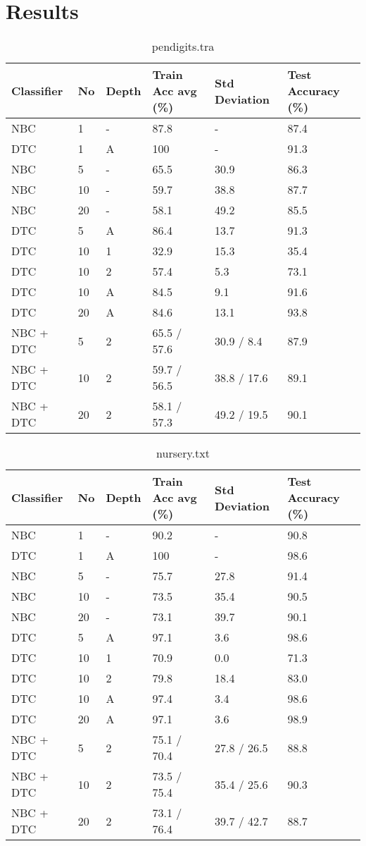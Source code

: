 \chapter{Results}
\label{ch:results}
\begin{table}[h]
	\centering
	\begin{tabular}[h]{l|l|l|l|l|l}
		Classifier & No & Depth & Train Acc avg (\%) & Std Deviation & Test Accuracy (\%)\\
		\hline
		NBC       & 1  & - & 87.8 & - & 87.4 \\
		DTC       & 1  & A & 100  & - & 91.3 \\
		NBC       & 5  & - & 65.5 & 30.9 & 86.3 \\
		NBC       & 10 & - & 59.7 & 38.8 & 87.7 \\
		NBC       & 20 & - & 58.1 & 49.2 & 85.5 \\
		DTC       & 5  & A & 86.4 & 13.7 & 91.3 \\
		DTC       & 10 & 1 & 32.9 & 15.3 & 35.4 \\
		DTC       & 10 & 2 & 57.4 & 5.3 & 73.1 \\
		DTC       & 10 & A & 84.5 & 9.1 & 91.6 \\
		DTC       & 20 & A & 84.6 & 13.1 & 93.8 \\
		NBC + DTC & 5  & 2 & 65.5 / 57.6 & 30.9 / 8.4 & 87.9 \\
		NBC + DTC & 10 & 2 & 59.7 / 56.5 & 38.8 / 17.6 & 89.1 \\
		NBC + DTC & 20 & 2 & 58.1 / 57.3 & 49.2 / 19.5 & 90.1 \\
	\end{tabular}
	\caption{pendigits.tra}
	\label{tab:pendigits}
\end{table}

\begin{table}[h]
	\centering
	\begin{tabular}[h]{l|l|l|l|l|l}
		Classifier & No & Depth & Train Acc avg (\%) & Std Deviation & Test Accuracy (\%)\\
		\hline
		NBC       & 1  & - & 90.2 & - & 90.8 \\
		DTC       & 1  & A & 100 & - &  98.6 \\
		NBC       & 5  & - & 75.7 & 27.8 & 91.4 \\
		NBC       & 10 & - & 73.5 & 35.4 & 90.5 \\
		NBC       & 20 & - & 73.1 & 39.7 & 90.1 \\
		DTC       & 5  & A & 97.1 & 3.6 & 98.6 \\
		DTC       & 10 & 1 & 70.9 & 0.0 & 71.3 \\
		DTC       & 10 & 2 & 79.8 & 18.4 & 83.0 \\
		DTC       & 10 & A & 97.4 & 3.4 & 98.6 \\
		DTC       & 20 & A & 97.1 & 3.6 & 98.9 \\
		NBC + DTC & 5  & 2 & 75.1 / 70.4 & 27.8 / 26.5 & 88.8 \\
		NBC + DTC & 10 & 2 & 73.5 / 75.4 & 35.4 / 25.6 & 90.3 \\
		NBC + DTC & 20 & 2 & 73.1 / 76.4 & 39.7 / 42.7 & 88.7 \\
	\end{tabular}
	\caption{nursery.txt}
\end{table}

